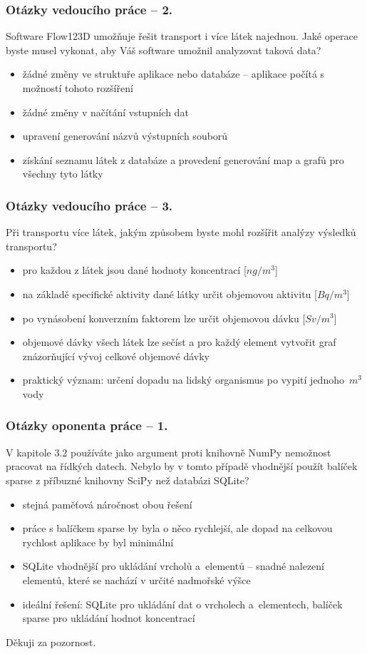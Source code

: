 \documentclass{beamer}
\begin{document}
\begin{frame}
	\frametitle{Otázky vedoucího práce -- 2.}
	\begin{block}{}
		Software Flow123D umožňuje řešit transport i více látek najednou. Jaké operace byste musel vykonat, aby Váš software umožnil analyzovat taková data?
	\end{block}
	\begin{itemize}
		\item žádné změny ve struktuře aplikace nebo databáze -- aplikace počítá s možností tohoto rozšíření
		\item žádné změny v načítání vstupních dat
		\item upravení generování názvů výstupních souborů
		\item získání seznamu látek z databáze a provedení generování map a grafů pro všechny tyto látky
	\end{itemize}
	\vfill
\end{frame}

\begin{frame}
	\frametitle{Otázky vedoucího práce -- 3.}
	\begin{block}{}
		Při transportu více látek, jakým způsobem byste mohl rozšířit analýzy výsledků transportu?
	\end{block}
	\begin{itemize}
		\item pro každou z látek jsou dané hodnoty koncentrací [$ng/m^3$]
		\item na základě specifické aktivity dané látky určit objemovou aktivitu [$Bq/m^3$]
		\item po vynásobení konverzním faktorem lze určit objemovou dávku [$Sv/m^3$]
		\item objemové dávky všech látek lze sečíst a pro každý element vytvořit graf znázorňující vývoj celkové objemové dávky
		\item praktický význam: určení dopadu na lidský organismus po vypití jednoho~$m^3$ vody
	\end{itemize}
	\vfill
\end{frame}

\begin{frame}
	\frametitle{Otázky oponenta práce -- 1.}
	\begin{block}{}
		V kapitole 3.2 používáte jako argument proti knihovně NumPy nemožnost pracovat na řídkých datech. Nebylo by v tomto případě vhodnější použít balíček sparse z příbuzné knihovny SciPy než databázi SQLite?
	\end{block}
	\begin{itemize}
		\item stejná paměťová náročnost obou řešení
		\item práce s balíčkem sparse by byla o něco rychlejší, ale dopad na celkovou rychlost aplikace by byl minimální
		\item SQLite vhodnější pro ukládání vrcholů a~elementů -- snadné nalezení elementů, které se nachází v určité nadmořské výšce
		\item ideální řešení: SQLite pro ukládání dat o vrcholech a~elementech, balíček sparse pro ukládání hodnot koncentrací
	\end{itemize}
	\vfill
\end{frame}

\begin{frame}{}{}
\begin{center}
\huge Děkuji za pozornost.
\end{center}
\end{frame}
\end{document}
